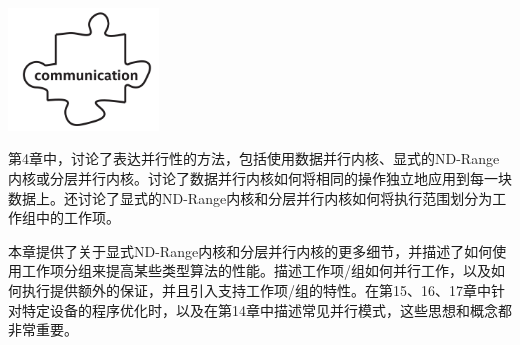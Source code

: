 \begin{center}
	\includegraphics[width=0.3\textwidth]{content/chapter-9/images/1}
\end{center}

第4章中，讨论了表达并行性的方法，包括使用数据并行内核、显式的ND-Range内核或分层并行内核。讨论了数据并行内核如何将相同的操作独立地应用到每一块数据上。还讨论了显式的ND-Range内核和分层并行内核如何将执行范围划分为工作组中的工作项。\par

本章提供了关于显式ND-Range内核和分层并行内核的更多细节，并描述了如何使用工作项分组来提高某些类型算法的性能。描述工作项/组如何并行工作，以及如何执行提供额外的保证，并且引入支持工作项/组的特性。在第15、16、17章中针对特定设备的程序优化时，以及在第14章中描述常见并行模式，这些思想和概念都非常重要。\par